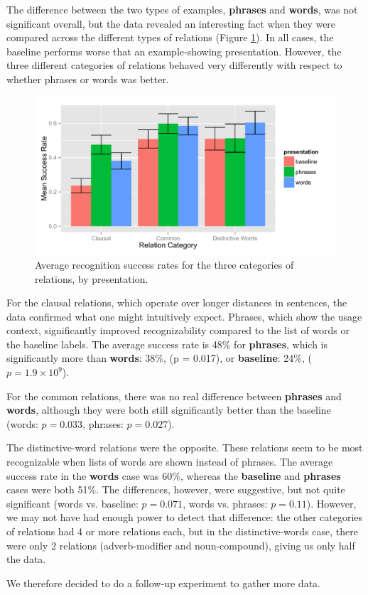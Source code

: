 \documentclass{sigchi}
\newcommand{\strong}[1] {\textbf{#1}}
\begin{document}
The difference between the two types of examples,  \strong{phrases} and \strong{words},  was not significant overall, but the data revealed an interesting fact when they were compared across the different types  of relations (Figure \ref{fig:results-by-relation-type}). In all cases, the baseline performs worse that an example-showing presentation. However, the three different categories of relations behaved very differently with respect to whether phrases or words was better.

\begin{figure}
\includegraphics[width=1.0\columnwidth]{fig/by-relation-type}
\caption{
	\label{fig:results-by-relation-type} Average recognition success rates for the three categories of relations, by presentation.
}
\end{figure}


For the clausal relations, which operate over longer distances in sentences, the data confirmed what one might intuitively expect. Phrases, which show the usage context, significantly improved recognizability compared to the list of words or the baseline labels. The average success rate is 48\% for \strong{phrases}, which is significantly more than \strong{words}: 38\%, (p = 0.017), or \strong{baseline}: 24\%, ($p= 1.9 \times 10^9$).

For the common relations, there was no real difference between \strong{phrases} and \strong{words}, although they were both still significantly better than the baseline (words: $p=0.033$, phrases: $p=0.027$).

The distinctive-word relations were the opposite. These relations seem to be most recognizable when lists of words are shown instead of phrases. The average success rate in the \strong{words} case was 60\%, whereas the \strong{baseline} and \strong{phrases} cases were both 51\%. The differences, however, were suggestive, but not quite significant (words vs. baseline: $p= 0.071$, words vs. phrases: $p= 0.11$). However, we may not have had enough power to detect that difference: the other categories of relations had 4 or more relations each, but in the distinctive-words case, there were only 2 relations (adverb-modifier and noun-compound), giving us only half the data.

We therefore decided to do a follow-up experiment to gather more data.



\end{document}
